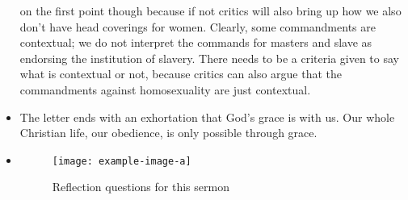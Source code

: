 \begin{itemize}
{{  on the first point though because if not critics will also bring up how we
  also don't have head coverings for women. Clearly, some commandments are
  contextual; we do not interpret the commands for masters and slave as
  endorsing the institution of slavery. There needs to be a criteria given to
  say what is contextual or not, because critics can also argue that the
  commandments against homosexuality are just contextual. }}
  \item{The letter ends with an exhortation that God's grace is with us. Our whole Christian life, our obedience, is only possible through grace. }
  \item{\begin{figure}[H]
    \centering
    \texttt{[image: example-image-a]}
    \caption[]{Reflection questions for this sermon}
    \label{}
  \end{figure}}
\end{itemize}